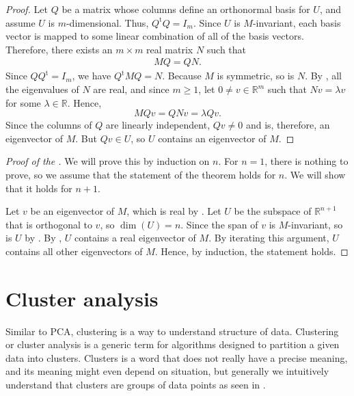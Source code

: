 \documentclass[a4paper, 12pt]{article}
\numberwithin{equation}{section}
\numberwithin{figure}{section}
\theoremstyle{definition}
\renewcommand{\geq}{\geqslant}
\newcommand{\R}{\mathbb{R}}
\newcommand{\tr}{\mathrm{t}}
\begin{document}
\begin{proof}
	Let $Q$ be a matrix whose columns define an orthonormal basis for $U$, and
	assume $U$ is $m$-dimensional. Thus, $Q^{\tr}Q = I_m$. Since $U$ is
	$M$-invariant, each basis vector is mapped to some linear combination of all
	of the basis vectors. Therefore, there exists an $m\times m$ real matrix $N$
	such that 
	\begin{align*}
		MQ = QN. 
	\end{align*}
	Since $QQ^{\tr} = I_m$, we have $Q^{\tr}MQ = N$. Because $M$ is symmetric,
	so is $N$. By , all the eigenvalues of $N$ are real,
	and since $m\geq 1$, let $0\neq v\in\R^m$ such that $Nv=\lambda v$ for some
	$\lambda\in \R$. Hence, 
	\[ 
		MQv = QNv = \lambda Qv.
	\] 
	Since the columns of $Q$ are linearly independent, $Qv\neq 0$ and is,
	therefore, an eigenvector of $M$. But $Qv\in U$, so $U$ contains an
	eigenvector of $M$.
\end{proof}

\begin{proof}[Proof of the ]
	We will prove this by induction on $n$. For $n=1$, there is nothing to
	prove, so we assume that the statement of the theorem holds for $n$. We will
	show that it holds for $n+1$.

	Let $v$ be an eigenvector of $M$, which is real by .
	Let $U$ be the subspace of $\R^{n+1}$ that is orthogonal to $v$, so $\dim(U)
	= n$. Since the span of $v$ is $M$-invariant, so is $U$ by
	. By , $U$ contains a real
	eigenvector of $M$. By iterating this argument, $U$ contains all other
	eigenvectors of $M$. Hence, by induction, the statement holds. 
\end{proof}


\section{Cluster analysis}

Similar to PCA, clustering is a way to understand structure of data. Clustering
or cluster analysis is a generic term for algorithms designed to partition a
given data into clusters. Clusters is a word that does not really have a precise
meaning, and its meaning might even depend on situation, but generally we
intuitively understand that clusters are groups of data points as seen in
.
\end{document}
